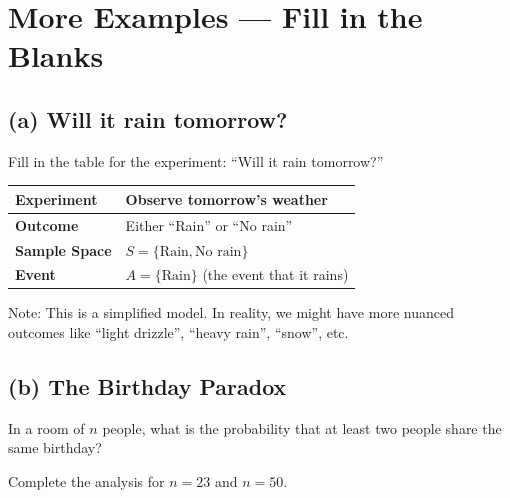 \documentclass[11pt,a4paper]{article}
\begin{document}
\newpage
\section{More Examples — Fill in the Blanks}

\subsection*{(a) Will it rain tomorrow?}

\begin{question}
Fill in the table for the experiment: ``Will it rain tomorrow?''
\end{question}

\begin{answer}
\begin{center}
\begin{tabular}{|l|p{10cm}|}
\hline
\textbf{Experiment} & Observe tomorrow's weather \\
\hline
\textbf{Outcome} & Either ``Rain'' or ``No rain'' \\
\hline
\textbf{Sample Space} & $S = \{\text{Rain}, \text{No rain}\}$ \\
\hline
\textbf{Event} & $A = \{\text{Rain}\}$ (the event that it rains) \\
\hline
\end{tabular}
\end{center}

Note: This is a simplified model. In reality, we might have more nuanced outcomes like ``light drizzle'', ``heavy rain'', ``snow'', etc.
\end{answer}

\subsection*{(b) The Birthday Paradox}

\begin{question}
In a room of $n$ people, what is the probability that at least two people share the same birthday?

Complete the analysis for $n = 23$ and $n = 50$.
\end{question}
\end{document}
